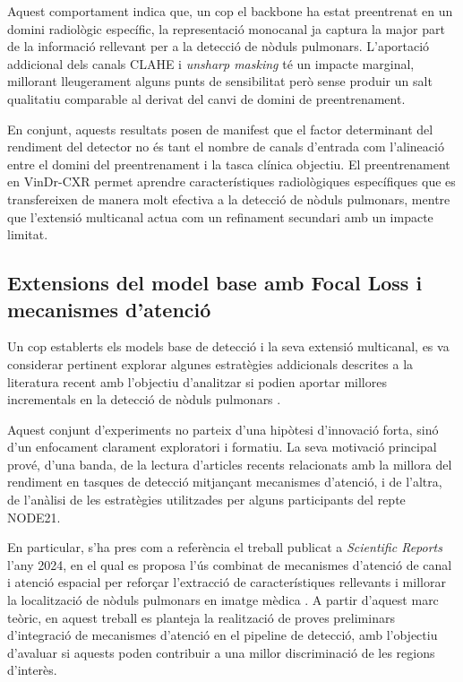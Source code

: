 \documentclass[conference]{IEEEtran}
\begin{document}
Aquest comportament indica que, un cop el backbone ha estat preentrenat en un
domini radiològic específic, la representació monocanal ja captura la major part
de la informació rellevant per a la detecció de nòduls pulmonars. L’aportació
addicional dels canals CLAHE i \textit{unsharp masking} té un impacte marginal,
millorant lleugerament alguns punts de sensibilitat però sense produir un salt
qualitatiu comparable al derivat del canvi de domini de preentrenament.

En conjunt, aquests resultats posen de manifest que el factor determinant del
rendiment del detector no és tant el nombre de canals d’entrada com l’alineació
entre el domini del preentrenament i la tasca clínica objectiu. El preentrenament
en VinDr-CXR permet aprendre característiques radiològiques específiques que es
transfereixen de manera molt efectiva a la detecció de nòduls pulmonars, mentre
que l’extensió multicanal actua com un refinament secundari amb un impacte
limitat.




\subsection{Extensions del model base amb Focal Loss i mecanismes d’atenció}

Un cop establerts els models base de detecció i la seva extensió multicanal, 
es va considerar pertinent explorar algunes estratègies addicionals descrites 
a la literatura recent amb l’objectiu d’analitzar si podien aportar millores 
incrementals en la detecció de nòduls pulmonars \cite{node21challenge,behrendt2023node21}.

Aquest conjunt d’experiments no parteix d’una hipòtesi d’innovació forta, sinó 
d’un enfocament clarament exploratori i formatiu. La seva motivació principal 
prové, d’una banda, de la lectura d’articles recents relacionats amb la millora 
del rendiment en tasques de detecció mitjançant mecanismes d’atenció, i de 
l’altra, de l’anàlisi de les estratègies utilitzades per alguns participants 
del repte NODE21.

En particular, s’ha pres com a referència el treball publicat a 
\textit{Scientific Reports} l’any 2024, en el qual es proposa l’ús combinat 
de mecanismes d’atenció de canal i atenció espacial per reforçar l’extracció 
de característiques rellevants i millorar la localització de nòduls pulmonars 
en imatge mèdica \cite{rehman2024dualattention}. A partir d’aquest marc teòric, 
en aquest treball es planteja la realització de proves preliminars d’integració 
de mecanismes d’atenció en el pipeline de detecció, amb l’objectiu d’avaluar 
si aquests poden contribuir a una millor discriminació de les regions d’interès.
\end{document}
